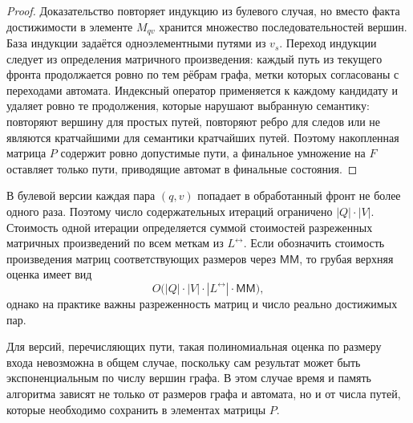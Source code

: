 \begin{proof}
    Доказательство повторяет индукцию из булевого случая, но вместо факта достижимости в элементе $M_{qv}$ хранится множество последовательностей вершин.
    База индукции задаётся одноэлементными путями из $v_s$.
    Переход индукции следует из определения матричного произведения: каждый путь из текущего фронта продолжается ровно по тем рёбрам графа, метки которых согласованы с переходами автомата.
    Индексный оператор применяется к каждому кандидату и удаляет ровно те продолжения, которые нарушают выбранную семантику: повторяют вершину для простых путей, повторяют ребро для следов или не являются кратчайшими для семантики кратчайших путей.
    Поэтому накопленная матрица $P$ содержит ровно допустимые пути, а финальное умножение на $F$ оставляет только пути, приводящие автомат в финальные состояния.
\end{proof}

В булевой версии каждая пара $(q,v)$ попадает в обработанный фронт не более одного раза.
Поэтому число содержательных итераций ограничено $|Q| \cdot |V|$.
Стоимость одной итерации определяется суммой стоимостей разреженных матричных произведений по всем меткам из $L^{\leftrightarrow}$.
Если обозначить стоимость произведения матриц соответствующих размеров через $\mathsf{MM}$, то грубая верхняя оценка имеет вид
\[
    O\bigl(|Q| \cdot |V| \cdot |L^{\leftrightarrow}| \cdot \mathsf{MM}\bigr),
\]
однако на практике важны разреженность матриц и число реально достижимых пар.

Для версий, перечисляющих пути, такая полиномиальная оценка по размеру входа невозможна в общем случае, поскольку сам результат может быть экспоненциальным по числу вершин графа.
В этом случае время и память алгоритма зависят не только от размеров графа и автомата, но и от числа путей, которые необходимо сохранить в элементах матрицы $P$.
